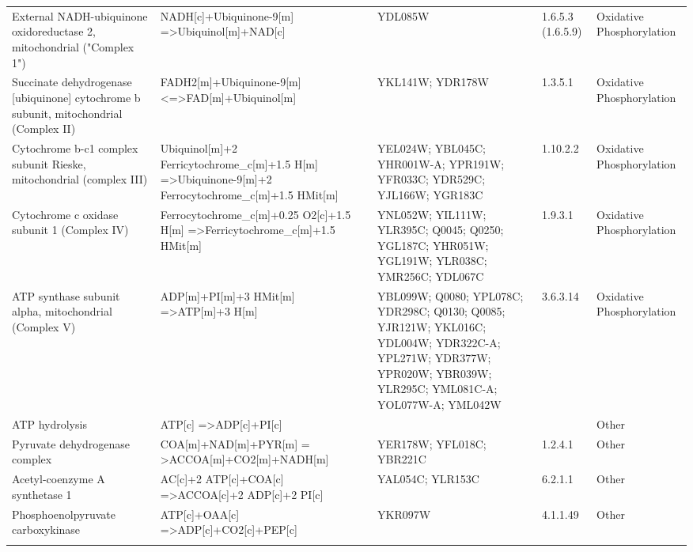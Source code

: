 {\begin{landscape}
\begin{longtable}{p{.20\linewidth} | p{.25\linewidth} | p{.19\linewidth} | p{.05\linewidth} | p{.10\linewidth}}
External NADH-ubiquinone oxidoreductase 2, mitochondrial ("Complex 1")  & NADH{[}c{]}+Ubiquinone-9{[}m{]} =\textgreater Ubiquinol{[}m{]}+NAD{[}c{]}  & YDL085W & 1.6.5.3 (1.6.5.9)  & Oxidative Phosphorylation \\
Succinate dehydrogenase {[}ubiquinone{]} cytochrome b subunit, mitochondrial (Complex II) & FADH2{[}m{]}+Ubiquinone-9{[}m{]} \textless{}=\textgreater FAD{[}m{]}+Ubiquinol{[}m{]} & YKL141W; YDR178W & 1.3.5.1  & Oxidative Phosphorylation \\
Cytochrome b-c1 complex subunit Rieske, mitochondrial (complex III)  & Ubiquinol{[}m{]}+2 Ferricytochrome\_c{[}m{]}+1.5 H{[}m{]} =\textgreater Ubiquinone-9{[}m{]}+2 Ferrocytochrome\_c{[}m{]}+1.5 HMit{[}m{]} & YEL024W; YBL045C; YHR001W-A; YPR191W; YFR033C; YDR529C; YJL166W; YGR183C & 1.10.2.2 & Oxidative Phosphorylation \\
Cytochrome c oxidase subunit 1 (Complex IV) & Ferrocytochrome\_c{[}m{]}+0.25 O2{[}c{]}+1.5 H{[}m{]} =\textgreater Ferricytochrome\_c{[}m{]}+1.5 HMit{[}m{]}  & YNL052W; YIL111W; YLR395C; Q0045; Q0250; YGL187C; YHR051W; YGL191W; YLR038C; YMR256C; YDL067C & 1.9.3.1  & Oxidative Phosphorylation \\
ATP synthase subunit alpha, mitochondrial (Complex V)  & ADP{[}m{]}+PI{[}m{]}+3 HMit{[}m{]} =\textgreater ATP{[}m{]}+3 H{[}m{]} & YBL099W; Q0080; YPL078C; YDR298C; Q0130; Q0085; YJR121W; YKL016C; YDL004W; YDR322C-A; YPL271W; YDR377W; YPR020W; YBR039W; YLR295C; YML081C-A; YOL077W-A; YML042W & 3.6.3.14 & Oxidative Phosphorylation \\
ATP hydrolysis & ATP{[}c{]} =\textgreater ADP{[}c{]}+PI{[}c{]} & &  & Other  \\
Pyruvate dehydrogenase complex  & COA{[}m{]}+NAD{[}m{]}+PYR{[}m{]} = \textgreater ACCOA{[}m{]}+CO2{[}m{]}+NADH{[}m{]}  & YER178W; YFL018C; YBR221C  & 1.2.4.1  & Other  \\
Acetyl-coenzyme A synthetase 1  & AC{[}c{]}+2 ATP{[}c{]}+COA{[}c{]} =\textgreater ACCOA{[}c{]}+2 ADP{[}c{]}+2 PI{[}c{]} & YAL054C; YLR153C & 6.2.1.1  & Other  \\
Phosphoenolpyruvate carboxykinase & ATP{[}c{]}+OAA{[}c{]} =\textgreater ADP{[}c{]}+CO2{[}c{]}+PEP{[}c{]} & YKR097W & 4.1.1.49 & Other \\ \hline
\label{table:rxns_smallYeast}
\end{longtable}
\end{landscape}  }
